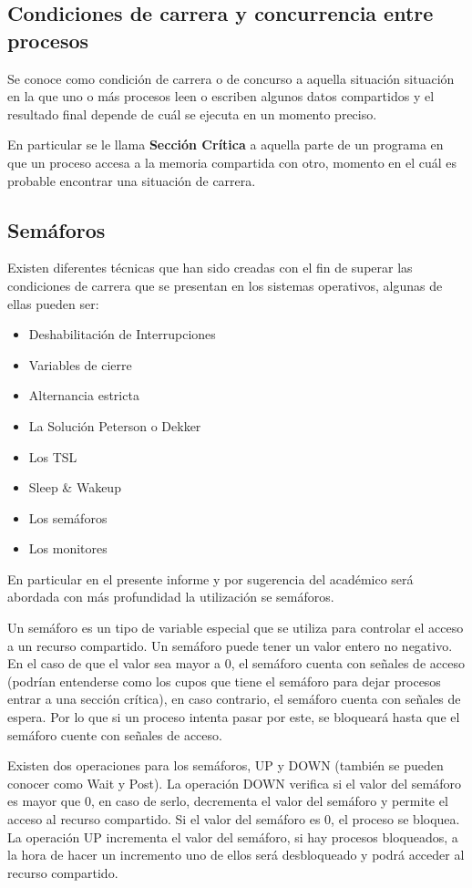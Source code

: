 \subsection{Condiciones de carrera y concurrencia entre procesos}
Se conoce como condición de carrera o de concurso a aquella situación situación en la que uno o más procesos leen o escriben algunos datos compartidos y el resultado final depende de cuál se ejecuta en un momento preciso.

En particular se le llama \textbf{Sección Crítica} a aquella parte de un programa en que un proceso accesa a la memoria compartida con otro, momento en el cuál es probable encontrar una situación de carrera.

\subsection{Semáforos}
Existen diferentes técnicas que han sido creadas con el fin de superar las condiciones de carrera que se presentan en los sistemas operativos, algunas de ellas pueden ser:
\begin{itemize}
    \item Deshabilitación de Interrupciones
    \item Variables de cierre
    \item Alternancia estricta
    \item La Solución Peterson o Dekker
    \item Los TSL
    \item Sleep \& Wakeup
    \item Los semáforos
    \item Los monitores
\end{itemize}

En particular en el presente informe y por sugerencia del académico será abordada con más profundidad la utilización se semáforos.

Un semáforo es un tipo de variable especial que se utiliza para controlar el acceso a un recurso compartido. Un semáforo puede tener un valor entero no negativo. En el caso de que el valor sea mayor a $0$, el semáforo cuenta con señales de acceso (podrían entenderse como los cupos que tiene el semáforo para dejar procesos entrar a una sección crítica), en caso contrario, el semáforo cuenta con señales de espera. Por lo que si un proceso intenta pasar por este, se bloqueará hasta que el semáforo cuente con señales de acceso.

Existen dos operaciones para los semáforos, UP y DOWN (también se pueden conocer como Wait y Post). La operación DOWN verifica si el valor del semáforo es mayor que $0$, en caso de serlo, decrementa el valor del semáforo y permite el acceso al recurso compartido. Si el valor del semáforo es $0$, el proceso se bloquea. La operación UP incrementa el valor del semáforo, si hay procesos bloqueados, a la hora de hacer un incremento uno de ellos será desbloqueado y podrá acceder al recurso compartido.